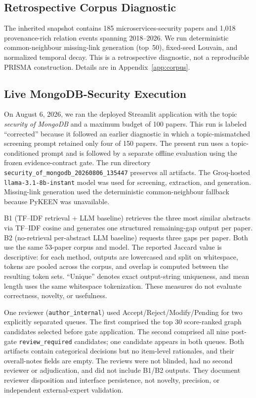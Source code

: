 \documentclass[conference, onecolumn]{IEEEtran}
\begin{document}
\subsection{Retrospective Corpus Diagnostic}

The inherited snapshot contains 185 microservices-security papers and 1,018 provenance-rich relation events spanning 2018--2026. We run deterministic common-neighbour missing-link generation (top~50), fixed-seed Louvain, and normalized temporal decay. This is a retrospective diagnostic, not a reproducible PRISMA construction. Details are in Appendix~\ref{app:corpus}.

\subsection{Live MongoDB-Security Execution}

On August 6, 2026, we ran the deployed Streamlit application with the topic \emph{security of MongoDB} and a maximum budget of 100 papers. This run is labeled ``corrected'' because it followed an earlier diagnostic in which a topic-mismatched screening prompt retained only four of 150 papers. The present run uses a topic-conditioned prompt and is followed by a separate offline evaluation using the frozen evidence-contract gate. The run directory \texttt{security\_of\_mongodb\_20260806\_135447} preserves all artifacts. The Groq-hosted \texttt{llama-3.1-8b-instant} model was used for screening, extraction, and generation. Missing-link generation used the deterministic common-neighbour fallback because PyKEEN was unavailable.

B1 (TF--IDF retrieval + LLM baseline) retrieves the three most similar abstracts via TF--IDF cosine and generates one structured remaining-gap output per paper. B2 (no-retrieval per-abstract LLM baseline) requests three gaps per paper. Both use the same 53-paper corpus and model. The reported Jaccard value is descriptive: for each method, outputs are lowercased and split on whitespace, tokens are pooled across the corpus, and overlap is computed between the resulting token sets. ``Unique'' denotes exact output-string uniqueness, and mean length uses the same whitespace tokenization. These measures do not evaluate correctness, novelty, or usefulness.

One reviewer (\texttt{author\_internal}) used Accept/Reject/Modify/Pending for two explicitly separated queues. The first comprised the top 30 score-ranked graph candidates selected before gate application. The second comprised all nine post-gate \texttt{review\_required} candidates; one candidate appears in both queues. Both artifacts contain categorical decisions but no item-level rationales, and their overall-notes fields are empty. The reviews were not blinded, had no second reviewer or adjudication, and did not include B1/B2 outputs. They document reviewer disposition and interface persistence, not novelty, precision, or independent external-expert validation.
\end{document}
